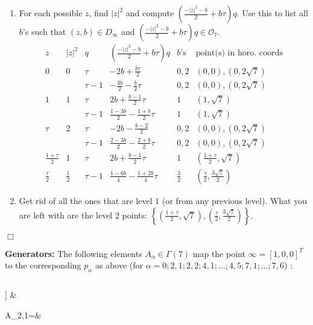 \documentclass{article}[12pt]
\newcommand{\EPf}{\hfill$\Box$\vspace{.5cm}}
\begin{document}
\begin{enumerate}
\item For each possible $z$, find $|z|^2$ and compute $\left(\frac{-|z|^2-b}{2}+b\tau\right)q$.  Use this to list all $b$'s such that $(z,b)\in D_{\infty}$ and $\left(\frac{-|z|^2-b}{2}+b\tau\right)q\in\mathcal{O}_7$.
$$
\begin{array}{cccccc}
z & |z|^2 & q & \left(\frac{-|z|^2-b}{2}+b\tau\right)q & b\text{'s} & \text{point(s) in horo. coords}\\
\hline
0 & 0 & \tau & -2b+\frac{b\tau}{2} & 0,2 & (0,0), (0,2\sqrt{7})\\
&  & \tau-1 & -\frac{3b}{2}-\frac{b}{2}\tau & 0,2 & (0,0), (0,2\sqrt{7})\\
\hline
1 & 1 & \tau & 2b + \frac{b-1}{2}\tau & 1 & (1,\sqrt{7})\\
&  & \tau-1 & \frac{1-3b}{2} - \frac{1+b}{2}\tau & 1 & (1,\sqrt{7})\\
\hline
\tau & 2 & \tau & -2b-\frac{b-2}{2} & 0,2 & (0,0), (0,2\sqrt{7})\\
&  & \tau-1 & \frac{2-3b}{2} - \frac{2+b}{2}\tau &  0,2 & (0,0), (0,2\sqrt{7})\\ 
\hline
\frac{1+\tau}{2} & 1 & \tau & 2b + \frac{b-1}{2}\tau & 1 & \left(\frac{1+\tau}{2}, \sqrt{7}\right)\\
\hline
\frac{\tau}{2} & \frac{1}{2} & \tau -1 & \frac{1-6b}{4} - \frac{1+2b}{4}\tau & \frac{3}{2} & \left(\frac{\tau}{2},\frac{3\sqrt{7}}{2}\right)
\end{array}
$$

\item Get rid of all the ones that are level 1 (or from any previous level).  What you are left with are the level $2$ points: $\left\{\left(\frac{1+\tau}{2}, \sqrt{7}\right), \left(\frac{\tau}{2},\frac{3\sqrt{7}}{2}\right)\right\}$. 
\end{enumerate}
\EPf




{\bf Generators:}  The following elements $A_\alpha \in \Gamma(7)$ map the point $\infty=[1,0,0]^T$ to the corresponding $p_\alpha$ as above (for $\alpha=0; 2,1; 2,2; 4,1;...; 4,5; 7,1;...;7,6$) :

$$
\begin{array}{ccc} A_0=I_0= &
  
  A_{2,1}= &
  
\end{document}
